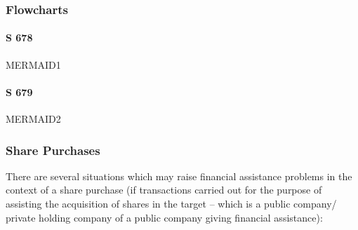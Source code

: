 \documentclass[
]{article}
\begin{document}
\hypertarget{flowcharts}{%
\subsubsection{Flowcharts}\label{flowcharts}}

\hypertarget{s-678}{%
\paragraph{S 678}\label{s-678}}

MERMAID1

\hypertarget{s-679}{%
\paragraph{S 679}\label{s-679}}

MERMAID2

\hypertarget{share-purchases}{%
\subsubsection{Share Purchases}\label{share-purchases}}

There are several situations which may raise financial assistance
problems in the context of a share purchase (if transactions carried out
for the purpose of assisting the acquisition of shares in the target --
which is a public company/ private holding company of a public company
giving financial assistance):
\end{document}
